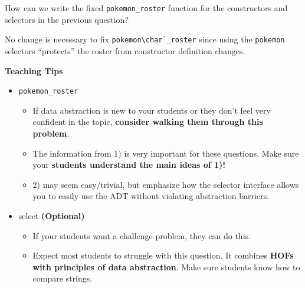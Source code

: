     
    \begin{blocksection}
    \question How can we write the fixed \lstinline{pokemon_roster} function for
    the constructors and selectors in the previous question?
    
    \begin{solution}[1.5in]
    No change is necessary to fix \lstinline{pokemon\char`_roster} since using the
    \texttt{pokemon} selectors ``protects'' the roster from constructor definition
    changes.
    \end{solution}
    
    \begin{guide}
    \textbf{Teaching Tips}
    \begin{itemize}
        \item \texttt{pokemon\_roster}
        \begin{itemize}
            \item If data abstraction is new to your students or they don’t feel very confident in the topic, \textbf{consider walking them through this problem}.
            \item The information from 1) is very important for these questions. Make sure your \textbf{students understand the main ideas of 1)!}
            \item 2) may seem easy/trivial, but emphasize how the selector interface allows you to easily use the ADT without violating abstraction barriers.
        \end{itemize}
        \item select \textbf{(Optional)}
        \begin{itemize}
            \item If your students want a challenge problem, they can do this.
            \item Expect most students to struggle with this question. It combines \textbf{HOFs with principles of data abstraction}. Make sure students know how to compare strings.
        \end{itemize}
    \end{itemize}
    \end{guide}
    
    \end{blocksection}
    
